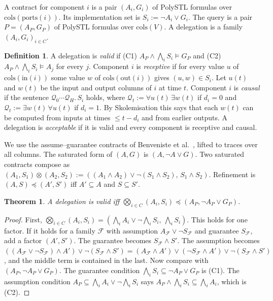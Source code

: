 \documentclass[11pt]{article}
\makeatletter
\renewcommand\paragraph{\@startsection{paragraph}{4}{\z@}{1.2ex plus .5ex minus .2ex}{-1em}{\normalfont\normalsize\bfseries}}
\newtheorem{theorem}{Theorem}
\theoremstyle{definition}
\newtheorem{definition}{Definition}
\theoremstyle{remark}
\newcommand{\cols}{\mathrm{cols}}
\newcommand{\ports}{\mathrm{ports}}
\newcommand{\inp}{\mathrm{in}}
\newcommand{\out}{\mathrm{out}}
\makeatother
\begin{document}
\paragraph{Contracts.}
A contract for component $i$ is a pair $(A_i,G_i)$ of PolySTL formulas over $\cols(\ports(i))$.
Its implementation set is $S_i:=\neg A_i\vee G_i$.
The query is a pair $P=(A_P,G_P)$ of PolySTL formulas over $\cols(V)$.
A delegation is a family $(A_i,G_i)_{i\in C}$.
\begin{definition}
A delegation is \emph{valid} if
(C1) $A_P\wedge\bigwedge_i S_i\models G_P$ and (C2) $A_P\wedge\bigwedge_i S_i\models A_j$ for every $j$.
Component $i$ is \emph{receptive} if for every value $u$ of $\cols(\inp(i))$ some value $w$ of $\cols(\out(i))$ gives $(u,w)\in S_i$.
Let $u(t)$ and $w(t)$ be the input and output columns of $i$ at time $t$.
Component $i$ is \emph{causal} if the sentence $\mathcal{Q}_0\cdots\mathcal{Q}_H.\,S_i$ holds, where $\mathcal{Q}_t:=\forall u(t)\,\exists w(t)$ if $d_i=0$ and
$\mathcal{Q}_t:=\exists w(t)\,\forall u(t)$ if $d_i=1$.
By Skolemisation this says that each $w(t)$ can be computed from inputs at times $\le t-d_i$ and from earlier outputs.
A delegation is \emph{acceptable} if it is valid and every component is receptive and causal.
\end{definition}

We use the assume--guarantee contracts of Benveniste et al.~\cite{contracts}, lifted to traces over all columns.
The saturated form of $(A,G)$ is $(A,\neg A\vee G)$.
Two saturated contracts compose as $(A_1,S_1)\otimes(A_2,S_2):=((A_1\wedge A_2)\vee\neg(S_1\wedge S_2),\,S_1\wedge S_2)$.
Refinement is $(A,S)\preceq(A',S')$ iff $A'\subseteq A$ and $S\subseteq S'$.
\begin{theorem}\label{thm:refine}
A delegation is valid iff $\bigotimes_{i\in C}(A_i,S_i)\preceq(A_P,\neg A_P\vee G_P)$.
\end{theorem}
\begin{proof}
First, $\bigotimes_{i\in C}(A_i,S_i)=(\bigwedge_iA_i\vee\neg\bigwedge_iS_i,\ \bigwedge_iS_i)$.
This holds for one factor. If it holds for a family $\mathcal{F}$ with assumption $A_{\mathcal{F}}\vee\neg S_{\mathcal{F}}$ and guarantee $S_{\mathcal{F}}$, add a factor $(A',S')$. The guarantee becomes $S_{\mathcal{F}}\wedge S'$.
The assumption becomes $((A_{\mathcal{F}}\vee\neg S_{\mathcal{F}})\wedge A')\vee\neg(S_{\mathcal{F}}\wedge S')=(A_{\mathcal{F}}\wedge A')\vee(\neg S_{\mathcal{F}}\wedge A')\vee\neg(S_{\mathcal{F}}\wedge S')$, and the middle term is contained in the last.
Now compare with $(A_P,\neg A_P\vee G_P)$.
The guarantee condition $\bigwedge_iS_i\subseteq\neg A_P\vee G_P$ is (C1).
The assumption condition $A_P\subseteq\bigwedge_iA_i\vee\neg\bigwedge_iS_i$ says $A_P\wedge\bigwedge_iS_i\subseteq\bigwedge_iA_i$, which is (C2).
\end{proof}
\end{document}
